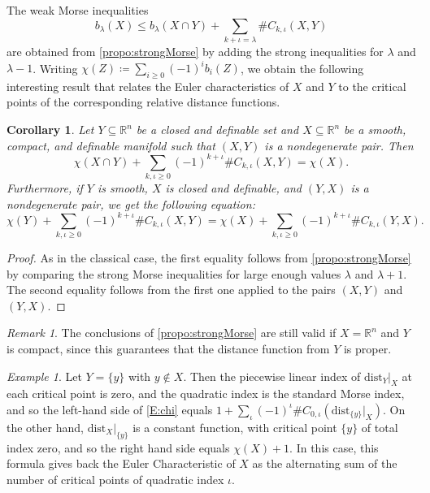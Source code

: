 \documentclass{amsart}
\newcommand{\R}{\mathbb{R}}
\newcommand{\dd}{\mathrm{dist}}
\newcommand{\dist}{{\mathrm{dist}_Y|_X}}
\def\lini{k}
\def\quadi{\iota}
\newtheorem{corollary}[subsubsection]{Corollary}
\theoremstyle{definition}
\theoremstyle{remark}
\newtheorem{remark}[subsubsection]{Remark}
\newtheorem{example}[subsubsection]{Example}
\begin{document}
The weak Morse inequalities
\[
b_{\lambda} (X) \le b_{\lambda} (X \cap Y) + \sum_{\lini + \quadi = \lambda} \# C_{\lini, \quadi}(X,Y)
\]
are obtained from \cref{propo:strongMorse} by adding the strong inequalities for $\lambda$ and $\lambda -1$.
Writing $\chi(Z) \coloneqq \sum_{i\ge 0} (-1)^i b_i (Z)$, we obtain the following interesting result that relates the Euler characteristics of $X$ and $Y$ to the critical points of the corresponding relative distance functions.


\begin{corollary}\label{coro:duality}
Let $Y\subseteq \R^n$ be a closed and definable set and $X\subseteq \R^n$ be a smooth, compact, and definable manifold such that $(X, Y)$ is a nondegenerate pair. Then
\[
\chi(X\cap Y)+\sum_{\lini, \quadi \geq 0}(-1)^{\lini + \quadi}\#C_{\lini, \quadi}(X, Y)=\chi(X).
\]
Furthermore, if $Y$ is smooth, $X$ is closed and definable, and $(Y,X)$ is a nondegenerate pair, we get the following equation:
\begin{equation}
\label{E:chi}
\chi(Y)+\sum_{\lini, \quadi\geq 0}(-1)^{\lini + \quadi}\#C_{\lini, \quadi}(X, Y)=\chi(X)+\sum_{\lini, \quadi\geq 0}(-1)^{\lini + \quadi}\#C_{\lini, \quadi}(Y, X).
\end{equation}
\end{corollary}
\begin{proof} As in the classical case, the first equality follows from \cref{propo:strongMorse} by comparing the strong Morse inequalities for large enough values $\lambda$ and $\lambda +1$. The second equality follows from the first one applied to the pairs $(X,Y)$ and $(Y,X)$.
\end{proof}

\begin{remark}The conclusions of \cref{propo:strongMorse} are still valid if $X=\R^n$ and $Y$ is compact, since this guarantees that the distance function from $Y$ is proper.
\end{remark}

\begin{example}
Let $Y=\{y\}$ with $y \notin X$. Then the piecewise linear index of $\dist$ at each critical point is zero, and the quadratic index is the standard Morse index, and so the left-hand side of \eqref{E:chi} equals $1 + \sum_{\quadi} (-1)^\quadi \#C_{0,\quadi}(\dd_{\{y\}}|_X)$. On the other hand, $\dd_X|_{\{y\}}$ is a constant function, with critical point $\{y\}$ of total index zero, and so the right hand side equals $\chi(X) + 1$. In this case, this formula gives back the Euler Characteristic of $X$ as the alternating sum of the number of critical points of quadratic index $\quadi$.
\end{example}
\end{document}
